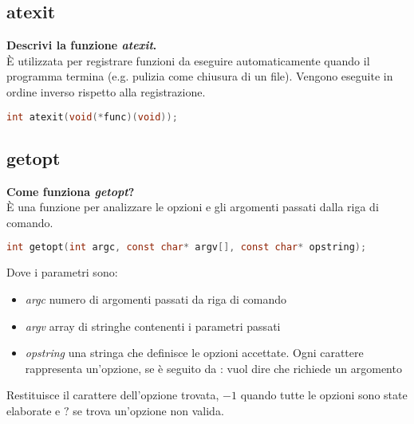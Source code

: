 \subsection{atexit}
\textbf{Descrivi la funzione \textit{atexit}.}\\
È utilizzata per registrare funzioni da eseguire automaticamente quando il programma termina (e.g. pulizia come chiusura di un file). Vengono eseguite in ordine inverso rispetto alla registrazione.
\begin{lstlisting}[language=C]
	int atexit(void(*func)(void));
\end{lstlisting}

\subsection{getopt}
\textbf{Come funziona \textit{getopt}?}\\
È una funzione per analizzare le opzioni e gli argomenti passati dalla riga di comando.
\begin{lstlisting}[language=C]
	int getopt(int argc, const char* argv[], const char* opstring);
\end{lstlisting}
Dove i parametri sono:
\begin{itemize}
	\item \textit{argc} numero di argomenti passati da riga di comando
	\item \textit{argv} array di stringhe contenenti i parametri passati
	\item \textit{opstring} una stringa che definisce le opzioni accettate. Ogni carattere rappresenta un'opzione, se è seguito da : vuol dire che richiede un argomento
\end{itemize}
Restituisce il carattere dell'opzione trovata, $-1$ quando tutte le opzioni sono state elaborate e $?$ se trova un'opzione non valida.
